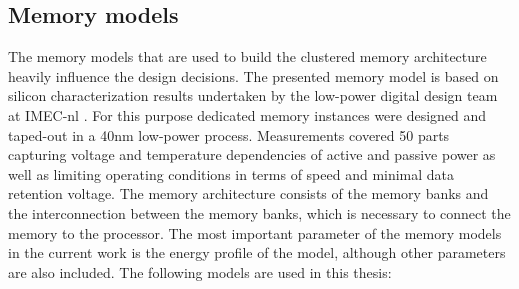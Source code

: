\subsection{Memory models}

The memory models that are used to build the clustered memory architecture heavily influence the design decisions.
The presented memory model is based on silicon characterization results undertaken by the low-power digital design team at IMEC-nl \cite{Gemmeke2016}.
For this purpose dedicated memory instances were designed and taped-out in a 40nm low-power process.
Measurements covered 50 parts capturing voltage and temperature dependencies of active and passive power as well as limiting operating conditions in terms of speed and minimal data retention voltage.
The memory architecture consists of the memory banks and the interconnection between the memory banks, which is necessary to connect the memory to the processor.
The most important parameter of the memory models in the current work is the energy profile of the model, although other parameters are also included.
The following models are used in this thesis:
